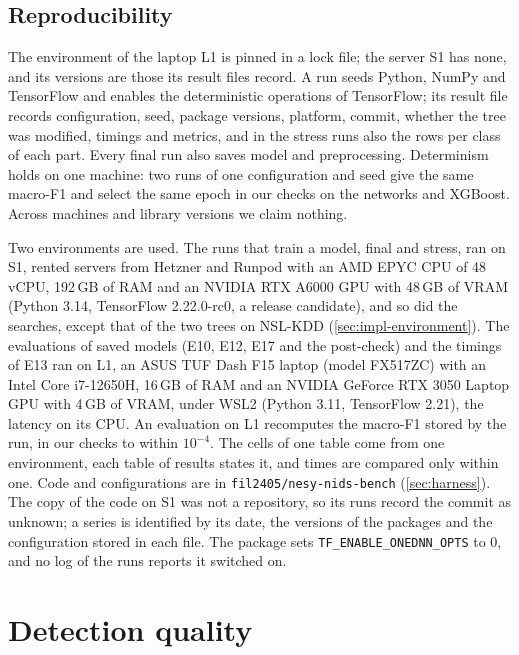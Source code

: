 \subsection{Reproducibility}
\label{sec:reproducibility}

The environment of the laptop L1 is pinned in a lock file; the server S1 has none, and its versions are those
its result files record. A run seeds Python, NumPy and TensorFlow and enables the
deterministic operations of TensorFlow; its result file records configuration, seed, package versions,
platform, commit, whether the tree was modified, timings and metrics, and in the stress runs also the
rows per class of each part.
Every final run also saves model and preprocessing. Determinism holds on one machine: two runs of one
configuration and seed give the same macro-F1 and select the same epoch in our checks on the networks
and XGBoost. Across
machines and library versions we claim nothing.

Two environments are used. The runs that train a model, final and stress, ran on S1, rented servers from Hetzner and Runpod with an AMD EPYC CPU of 48 vCPU, 192\,GB of RAM and an NVIDIA RTX A6000 GPU with 48\,GB of VRAM
(Python 3.14, TensorFlow 2.22.0-rc0, a release candidate), and so did the searches, except that of
the two trees on NSL-KDD (\cref{sec:impl-environment}). The evaluations of saved models (E10,
E12, E17 and the post-check) and the timings of E13 ran on L1, an ASUS TUF Dash F15 laptop (model FX517ZC) with an Intel Core i7-12650H, 16\,GB of RAM and an NVIDIA GeForce RTX 3050 Laptop GPU with 4\,GB of VRAM, under WSL2 (Python 3.11,
TensorFlow 2.21), the latency on its CPU. An evaluation on L1 recomputes the macro-F1 stored by
the run, in our checks to within $10^{-4}$. The cells of one table come from one environment,
each table of results states it, and times are compared only within one. Code and configurations are in
\texttt{fil2405/nesy-nids-bench} (\cref{sec:harness}). The copy of the code on S1 was not
a repository, so its runs record the commit as unknown; a series is identified by its date, the
versions of the packages and the configuration stored in each file. The package sets
\texttt{TF\_ENABLE\_ONEDNN\_OPTS} to 0, and no log of the runs reports it switched on.

\section{Detection quality}
\label{sec:detection-quality-dimension}

